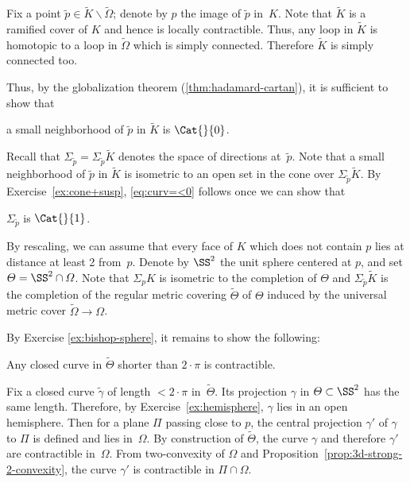 Fix a point $\tilde p\in \tilde K\backslash\tilde\Omega$; 
denote by $p$ the image of $\tilde p$ in~$K$.
Note that  $\tilde K$ is a ramified cover of $K$ and hence is locally contractible. Thus, any loop in $\tilde K$ is homotopic to a loop in $\tilde\Omega$ which is simply connected.
Therefore $\tilde K$ is simply connected too.

Thus, by the globalization theorem (\ref{thm:hadamard-cartan}), it is sufficient to show that

\begin{clm}{}\label{eq:curv=<0}
a small neighborhood of $\tilde p$ in $\tilde K$ is $\Cat{}{0}$.
\end{clm}

Recall that $\Sigma_{\tilde p}=\Sigma_{\tilde p}\tilde K$ denotes the space of directions at~$\tilde p$.
Note that a small neighborhood of $\tilde p$ in $\tilde K$
is isometric to an open set in the cone over $\Sigma_{\tilde p}\tilde K$.
By Exercise~\ref{ex:cone+susp}, \ref{eq:curv=<0} follows once we can show that

\begin{clm}{}\label{eq:curv=<1}
$\Sigma_{\tilde p}$ is $\Cat{}{1}$.
\end{clm}

By  rescaling, we can assume that every face of $K$ which does not contain $p$ lies at distance at least 2 from~$p$.
Denote by $\SS^2$ the unit sphere centered at $p$, and 
set $\Theta=\SS^2\cap\Omega$.
Note that $\Sigma_pK$ is isometric to the completion of $\Theta$
and $\Sigma_{\tilde p}\tilde K$ is the completion of the regular metric covering $\tilde\Theta$ of $\Theta$  induced by the universal metric cover $\tilde \Omega\to \Omega$.

By Exercise \ref{ex:bishop-sphere}, it remains to show  the following:
\begin{clm}{}
Any closed curve in $\tilde\Theta$ shorter than $2\cdot\pi$ is contractible.
\end{clm}

Fix a closed curve $\tilde \gamma$ of length $<2\cdot\pi$ in~$\tilde\Theta$.
Its projection $\gamma$ in $\Theta\subset\SS^2$ has the same length.
Therefore, by Exercise~\ref{ex:hemisphere}, $\gamma$ lies in an open hemisphere.
Then for a plane $\Pi$ passing close to $p$,
the central projection $\gamma'$ of $\gamma$ to $\Pi$ is defined and lies in~$\Omega$.
By construction of $\tilde\Theta$, the curve $\gamma$ and therefore $\gamma'$ are contractible in~$\Omega$.
From two-convexity of $\Omega$
and Proposition~\ref{prop:3d-strong-2-convexity},
the curve $\gamma'$ is contractible in $\Pi\cap \Omega$.


